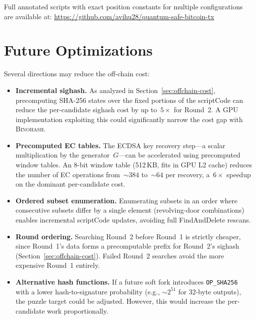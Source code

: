 \documentclass[11pt, a4paper]{article}
\begin{document}
\noindent Full annotated scripts with exact position constants for multiple configurations are available at: \url{https://github.com/avihu28/quantum-safe-bitcoin-tx}

\section{Future Optimizations}
\label{app:future-optimizations}

Several directions may reduce the off-chain cost:

\begin{itemize}
    \item \textbf{Incremental sighash.} As analyzed in Section~\ref{sec:offchain-cost}, precomputing SHA-256 states over the fixed portions of the scriptCode can reduce the per-candidate sighash cost by up to~$5\times$ for Round~2. A GPU implementation exploiting this could significantly narrow the cost gap with \textsc{Binohash}.

    \item \textbf{Precomputed EC tables.} The ECDSA key recovery step---a scalar multiplication by the generator~$G$---can be accelerated using precomputed window tables. An 8-bit window table (512\,KB, fits in GPU L2 cache) reduces the number of EC operations from~${\sim}384$ to~${\sim}64$ per recovery, a~$6\times$ speedup on the dominant per-candidate cost.

    \item \textbf{Ordered subset enumeration.} Enumerating subsets in an order where consecutive subsets differ by a single element (revolving-door combinations) enables incremental scriptCode updates, avoiding full FindAndDelete rescans.

    \item \textbf{Round ordering.} Searching Round~2 before Round~1 is strictly cheaper, since Round~1's data forms a precomputable prefix for Round~2's sighash (Section~\ref{sec:offchain-cost}). Failed Round~2 searches avoid the more expensive Round~1 entirely.

    \item \textbf{Alternative hash functions.} If a future soft fork introduces \texttt{OP\_SHA256} with a lower hash-to-signature probability (e.g., ${\sim}2^{51}$ for 32-byte outputs), the puzzle target could be adjusted. However, this would increase the per-candidate work proportionally.
\end{itemize}
\end{document}
